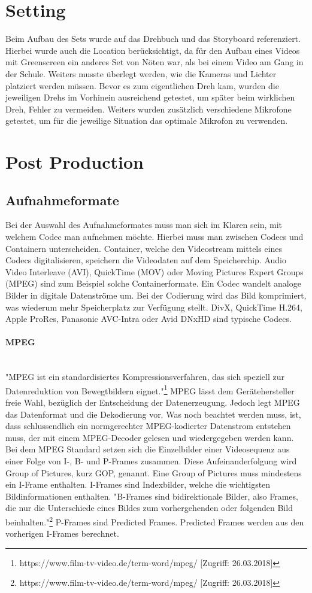 \section{Setting}
Beim Aufbau des Sets wurde auf das Drehbuch und das Storyboard referenziert. Hierbei wurde auch die Location berücksichtigt, da für den Aufbau eines Videos mit Greenscreen ein anderes Set von Nöten war, als bei einem Video am Gang in der Schule. Weiters musste überlegt werden, wie die Kameras und Lichter platziert werden müssen. Bevor es zum eigentlichen Dreh kam, wurden die jeweiligen Drehs im Vorhinein ausreichend getestet, um später beim wirklichen Dreh, Fehler zu vermeiden. Weiters wurden zusätzlich verschiedene Mikrofone getestet, um für die jeweilige Situation das optimale Mikrofon zu verwenden.
\section{Post Production}
\subsection{Aufnahmeformate}
Bei der Auswahl des Aufnahmeformates muss man sich im Klaren sein, mit welchem Codec man aufnehmen möchte. Hierbei muss man zwischen Codecs und Containern unterscheiden. Container, welche den Videostream mittels eines Codecs digitalisieren, speichern die Videodaten auf dem Speicherchip. Audio Video Interleave (AVI), QuickTime (MOV) oder Moving Pictures Expert Groups (MPEG) sind zum Beispiel solche Containerformate. Ein Codec wandelt analoge Bilder in digitale Datenströme um. Bei der Codierung wird das Bild komprimiert, was wiederum mehr Speicherplatz zur Verfügung stellt. DivX, QuickTime H.264, Apple ProRes, Panasonic AVC-Intra oder Avid DNxHD sind typische Codecs. 
\paragraph{MPEG}
\leavevmode \\
"MPEG ist ein standardisiertes Kompressionsverfahren, das sich speziell zur Datenreduktion von Bewegtbildern eignet."\footnote{\label{}https://www.film-tv-video.de/term-word/mpeg/ [Zugriff: 26.03.2018]} MPEG lässt dem Gerätehersteller freie Wahl, bezüglich der Entscheidung der Datenerzeugung. Jedoch legt MPEG das Datenformat und die Dekodierung vor. Was noch beachtet werden muss, ist, dass schlussendlich ein normgerechter MPEG-kodierter Datenstrom entstehen muss, der mit einem MPEG-Decoder gelesen und wiedergegeben werden kann. Bei dem MPEG Standard setzen sich die Einzelbilder einer Videosequenz aus einer Folge von I-, B- und P-Frames zusammen. Diese Aufeinanderfolgung wird Group of Pictures, kurz GOP, genannt. Eine Group of Pictures muss mindestens ein I-Frame enthalten. I-Frames sind Indexbilder, welche die wichtigsten Bildinformationen enthalten. "B-Frames sind  bidirektionale Bilder, also Frames, die nur die Unterschiede eines Bildes zum vorhergehenden oder folgenden Bild beinhalten."\footnote{\label{}https://www.film-tv-video.de/term-word/mpeg/ [Zugriff: 26.03.2018]} P-Frames sind Predicted Frames. Predicted Frames werden aus den vorherigen I-Frames berechnet.
